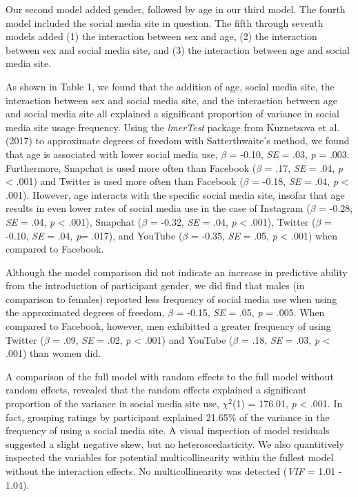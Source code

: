 \documentclass[man, fleqn, noextraspace]{apa6}
\theoremstyle{definition}
\theoremstyle{definition}
\theoremstyle{definition}
\theoremstyle{remark}
\begin{document}
Our second model added gender, followed by age in our third model. The
fourth model included the social media site in question. The fifth
through seventh models added (1) the interaction between sex and age,
(2) the interaction between sex and social media site, and (3) the
interaction between age and social media site.

As shown in Table 1, we found that the addition of age, social media
site, the interaction between sex and social media site, and the
interaction between age and social media site all explained a
significant proportion of variance in social media site usage frequency.
Using the \emph{lmerTest} package from Kuznetsova et al. (2017) to
approximate degrees of freedom with Satterthwaite's method, we found
that age is associated with lower social media use, \(\beta\) = -0.10,
\emph{SE} = .03, \emph{p} = .003. Furthermore, Snapchat is used more
often than Facebook (\(\beta\) = .17, \emph{SE} = .04, \emph{p}
\textless{} .001) and Twitter is used more often than Facebook
(\(\beta\) = -0.18, \emph{SE} = .04, \emph{p} \textless{} .001).
However, age interacts with the specific social media site, insofar that
age results in even lower rates of social media use in the case of
Instagram (\(\beta\) = -0.28, \emph{SE} = .04, \emph{p} \textless{}
.001), Snapchat (\(\beta\) = -0.32, \emph{SE} = .04, \emph{p}
\textless{} .001), Twitter (\(\beta\) = -0.10, \emph{SE} = .04,
\emph{p}= .017), and YouTube (\(\beta\) = -0.35, \emph{SE} = .05,
\emph{p} \textless{} .001) when compared to Facebook.

Although the model comparison did not indicate an increase in predictive
ability from the introduction of participant gender, we did find that
males (in comparison to females) reported less frequency of social media
use when using the approximated degrees of freedom, \(\beta\) = -0.15,
\emph{SE} = .05, \emph{p} = .005. When compared to Facebook, however,
men exhibitted a greater frequency of using Twitter (\(\beta\) = .09,
\emph{SE} = .02, \emph{p} \textless{} .001) and YouTube (\(\beta\) =
.18, \emph{SE} = .03, \emph{p} \textless{} .001) than women did.

A comparison of the full model with random effects to the full model
without random effects, revealed that the random effects explained a
significant proportion of the variance in social media site use,
\(\chi^2\)(1) = 176.01, \emph{p} \textless{} .001. In fact, grouping
ratings by participant explained 21.65\% of the variance in the
frequency of using a social media site. A visual inspection of model
residuals suggested a slight negative skew, but no heteroscedasticity.
We also quantitively inspected the variables for potential
multicollinearity within the fullest model without the interaction
effects. No multicollinearity was detected (\emph{VIF} = 1.01 - 1.04).
\end{document}
